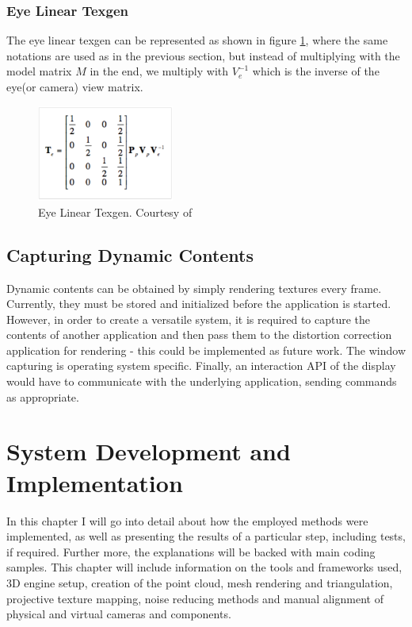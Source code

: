 \documentclass[]{article}
\begin{document}
\subsubsection{Eye Linear Texgen}

The eye linear texgen can be represented as shown in figure \ref{fig:EyeLinearTexgen}, where the same notations are used as in the previous section, but instead of multiplying with the model matrix $M$ in the end, we multiply with $V^{-1}_{e}$ which is the inverse of the eye(or camera) view matrix.

\begin{figure}[hbtp]
    \centering
    \includegraphics[width=0.4\textwidth]{figures/EyeLinearTexgen.PNG}
    \caption{Eye Linear Texgen. Courtesy of \cite{cassNvidia}}
    \label{fig:EyeLinearTexgen}
\end{figure}

\subsection{Capturing Dynamic Contents}

Dynamic contents can be obtained by simply rendering textures every frame. Currently, they must be stored and initialized before the application is started. However, in order to create a versatile system, it is required to capture the contents of another application and then pass them to the distortion correction application for rendering - this could be implemented as future work. The window capturing is operating system specific. Finally, an interaction API of the display would have to communicate with the underlying application, sending commands as appropriate.

\newpage
\section{System Development and Implementation}

In this chapter I will go into detail about how the employed methods  were implemented, as well as presenting the results of a particular step, including tests, if required. Further more, the explanations will be backed with main coding samples. This chapter will include information on the tools and frameworks used, 3D engine setup, creation of the point cloud, mesh rendering and triangulation, projective texture mapping, noise reducing methods and manual alignment of physical and virtual cameras and components.
\end{document}
